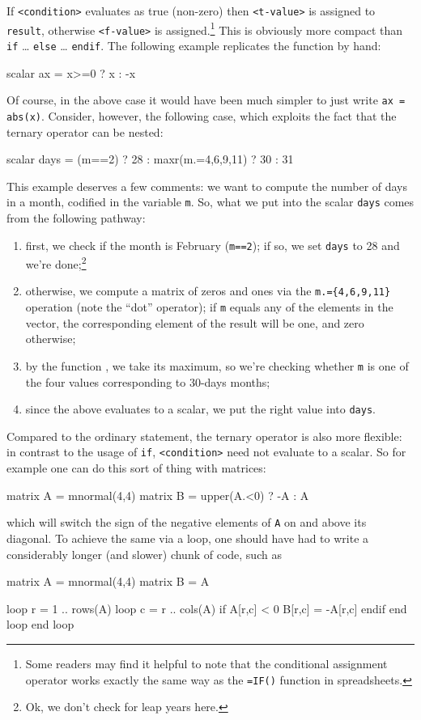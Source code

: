 If \texttt{<condition>} evaluates as true (non-zero) then
\texttt{<t-value>} is assigned to \texttt{result}, otherwise
\texttt{<f-value>} is assigned.\footnote{Some readers may find it
  helpful to note that the conditional assignment operator works
  exactly the same way as the \texttt{=IF()} function in
  spreadsheets.}  This is obviously more compact than \texttt{if}
\dots{} \texttt{else} \dots{} \texttt{endif}. The following example
replicates the  function by hand:
\begin{code}
scalar ax = x>=0 ? x : -x
\end{code}
Of course, in the above case it would have been much simpler to just
write \texttt{ax = abs(x)}. Consider, however, the following case,
which exploits the fact that the ternary operator can be nested:
\begin{code}
scalar days = (m==2) ? 28 : maxr(m.={4,6,9,11}) ? 30 : 31
\end{code}
This example deserves a few comments: we want to compute the number of
days in a month, codified in the variable \texttt{m}. So, what we put into
the scalar \texttt{days} comes from the following pathway:
\begin{enumerate}
\item first, we check if the month is February (\texttt{m==2}); if so,
  we set \texttt{days} to 28 and we're done;\footnote{Ok, we don't
    check for leap years here.}
\item otherwise, we compute a matrix of zeros and ones via the
  \verb|m.={4,6,9,11}| operation (note the ``dot'' operator); if
  \texttt{m} equals any of the elements in the vector, the
  corresponding element of the result will be one, and zero otherwise;
\item by the function , we take its maximum, so we're
  checking whether \texttt{m} is one of the four values corresponding
  to 30-days months;
\item since the above evaluates to a scalar, we put the right value
  into \texttt{days}.
\end{enumerate}

Compared to the ordinary  statement, the ternary operator is
also more flexible: in contrast to the usage of \texttt{if},
\texttt{<condition>} need not evaluate to a scalar.  So for example
one can do this sort of thing with matrices:
\begin{code}
matrix A = mnormal(4,4)
matrix B = upper(A.<0) ? -A : A
\end{code}
which will switch the sign of the negative elements of \texttt{A} on
and above its diagonal. To achieve the same via a loop, one should
have had to write a considerably longer (and slower) chunk of code,
such as
\begin{code}
matrix A = mnormal(4,4)
matrix B = A

loop r = 1 .. rows(A)
  loop c = r .. cols(A)
     if A[r,c] < 0
       B[r,c] = -A[r,c]
     endif
  end loop
end loop
\end{code}

